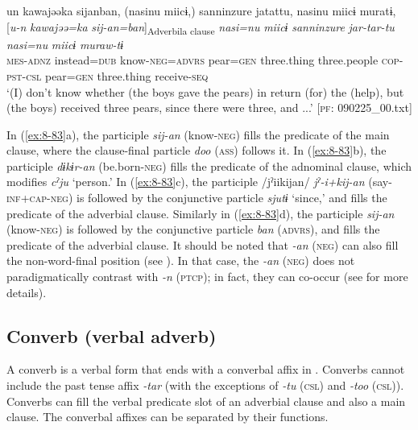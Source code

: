 \ex
{\TM}
\glll  un  kawajəəka  sijanban,  (nasinu  miicɨ,)       {\textbar}sanninzure{\textbar}  jatattu,  nasinu  miicɨ  muratɨ,\\
{}[\textit{u-n}  \textit{kawajəə=ka}  \textit{sij-an=ban}]\textsubscript{Adverbila clause}  \textit{nasi=nu}  \textit{miicɨ} \textit{sanninzure}  \textit{jar-tar-tu}  \textit{nasi=nu}  \textit{miicɨ}  \textit{muraw-tɨ}\\
      \textsc{mes}-\textsc{adnz}  instead=\textsc{dub}  know-\textsc{neg}=\textsc{advrs}  pear=\textsc{gen}  three.thing      three.people  \textsc{cop}-\textsc{pst}-\textsc{csl}  pear=\textsc{gen}  three.thing  receive-\textsc{seq}\\
\glt ‘(I) don’t know whether (the boys gave the pears) in return (for) the (help), but (the boys) received three pears, since there were three, and ...’ [\textsc{pf}: 090225\_00.txt]
\z
\z

In (\ref{ex:8-83}a), the participle \textit{sij-an} (know-\textsc{neg}) fills the predicate of the main clause, where the clause-final particle \textit{doo} (\textsc{ass}) follows it. In (\ref{ex:8-83}b), the participle \textit{dɨkɨr-an} (be.born-\textsc{neg}) fills the predicate of the adnominal clause, which modifies \textit{cˀju} ‘person.’ In (\ref{ex:8-83}c), the participle /jˀiikijan/ \textit{jˀ-i+kij-an} (say-\textsc{inf}+\textsc{cap}-\textsc{neg}) is followed by the conjunctive particle \textit{sjutɨ} ‘since,’ and fills the predicate of the adverbial clause. Similarly in (\ref{ex:8-83}d), the participle \textit{sij-an} (know-\textsc{neg}) is followed by the conjunctive particle \textit{ban} (\textsc{advrs}), and fills the predicate of the adverbial clause. It should be noted that \textit{-an} (\textsc{neg}) can also fill the non-word-final position (see ). In that case, the \textit{-an} (\textsc{neg}) does not paradigmatically contrast with \textit{-n} (\textsc{ptcp}); in fact, they can co-occur (see  for more details).

\subsection{Converb (verbal adverb)}

A converb is a verbal form that ends with a converbal affix in . Converbs cannot include the past tense affix \textit{-tar} (with the exceptions of \textit{-tu} (\textsc{csl}) and \textit{-too} (\textsc{csl})). Converbs can fill the verbal predicate slot of an adverbial clause and also a main clause. The converbal affixes can be separated by their functions.

